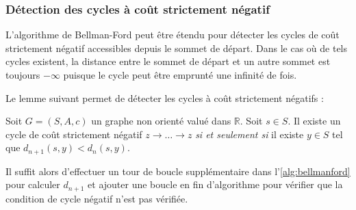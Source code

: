 \documentclass[../../../main.tex]{subfiles}
\begin{document}
\subsubsection{Détection des cycles à coût strictement négatif}
L'algorithme de Bellman-Ford peut être étendu pour détecter les cycles de coût strictement négatif accessibles depuis le sommet de départ. Dans le cas où de tels cycles existent, la distance entre le sommet de départ et un autre sommet est toujours $-\infty$ puisque le cycle peut être emprunté une infinité de fois.

Le lemme suivant permet de détecter les cycles à coût strictement négatifs :

 Soit $G = (S, A, c)$ un graphe non orienté valué dans $\mathbb{R}$. Soit $s\in S$. Il existe un cycle de coût strictement négatif $z\rightarrow \dots \rightarrow z$ \textit{si et seulement si} il existe $y\in S$ tel que $d_{n+1}(s, y) < d_n(s, y)$.

Il suffit alors d'effectuer un tour de boucle supplémentaire dans l'\ref{alg:bellmanford} pour calculer $d_{n+1}$ et ajouter une boucle en fin d'algorithme pour vérifier que la condition de cycle négatif n'est pas vérifiée.
\end{document}
